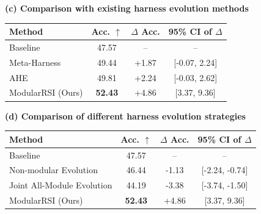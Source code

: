 \documentclass{article} %
\begin{document}
\begin{table}[t]
\vspace{8pt}

\textbf{(c) Comparison with existing harness evolution methods}

\vspace{2pt}

\begin{tabular}{lccc}
\toprule
\textbf{Method} &
\textbf{Acc. $\uparrow$} &
\textbf{$\Delta$ Acc.} &
\textbf{95\% CI of $\Delta$} \\
\midrule
Baseline          & 47.57 & -- & -- \\
Meta-Harness      & 49.44 & +1.87 & [-0.07, 2.24] \\
AHE               & 49.81 & +2.24 & [-0.03, 2.62] \\
ModularRSI (Ours) & \textbf{52.43} & +4.86 & [3.37, 9.36] \\
\bottomrule
\end{tabular}

\vspace{8pt}

\textbf{(d) Comparison of different harness evolution strategies}

\vspace{2pt}

\begin{tabular}{lccc}
\toprule
\textbf{Method} &
\textbf{Acc. $\uparrow$} &
\textbf{$\Delta$ Acc.} &
\textbf{95\% CI of $\Delta$} \\
\midrule
Baseline                   & 47.57 & -- & -- \\
Non-modular Evolution      & 46.44 & -1.13 & [-2.24, -0.74] \\
Joint All-Module Evolution & 44.19 & -3.38 & [-3.74, -1.50] \\
ModularRSI (Ours)          & \textbf{52.43} & +4.86 & [3.37, 9.36] \\
\bottomrule
\end{tabular}

\label{tab:confidence_interval_analysis}

\end{table}




\end{document}
